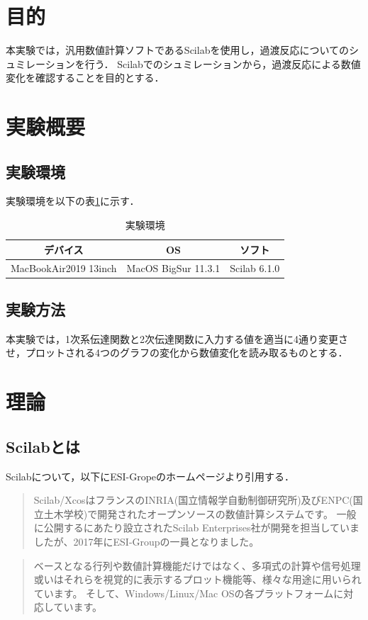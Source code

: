 \documentclass[a4paper,11pt]{jsarticle}
\begin{document}
\section{目的}
  本実験では，汎用数値計算ソフトであるScilabを使用し，過渡反応についてのシュミレーションを行う．
  Scilabでのシュミレーションから，過渡反応による数値変化を確認することを目的とする．

\section{実験概要}
  \subsection{実験環境}
    実験環境を以下の表\ref{em}に示す．
    \begin{table}[H]
      \begin{center}
        \caption{実験環境}
        \begin{tabular}{|c|c|c|}  \hline 
          デバイス &  OS & ソフト \\ \hline 
          MacBookAir2019 13inch &  MacOS BigSur 11.3.1 & Scilab 6.1.0 \\ \hline
        \end{tabular}
        \label{em}
      \end{center}
    \end{table}

  \subsection{実験方法}
    本実験では，1次系伝達関数と2次伝達関数に入力する値を適当に4通り変更させ，プロットされる4つのグラフの変化から数値変化を読み取るものとする．


\section{理論}
  \subsection{Scilabとは}
    Scilabについて，以下にESI-Gropeのホームページより引用する．~\cite{ESI}
    \begin{quotation}
      Scilab/XcosはフランスのINRIA(国立情報学自動制御研究所)及びENPC(国立土木学校)で開発されたオープンソースの数値計算システムです。
      一般に公開するにあたり設立されたScilab Enterprises社が開発を担当していましたが、2017年にESI-Groupの一員となりました。
    \end{quotation}
    \begin{quotation}
      ベースとなる行列や数値計算機能だけではなく、多項式の計算や信号処理或いはそれらを視覚的に表示するプロット機能等、様々な用途に用いられています。
      そして、Windows/Linux/Mac OSの各プラットフォームに対応しています。
    \end{quotation}
\end{document}
